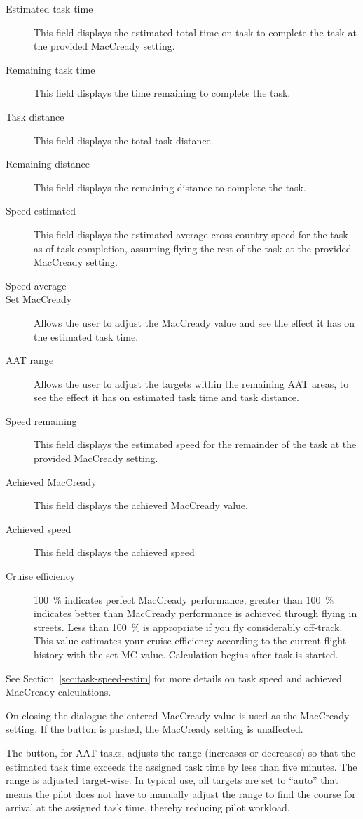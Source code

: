 \begin{description}
\item[Estimated task time]  This field displays the estimated total time 
  on task to complete the task at the provided MacCready setting.
\item[Remaining task time]  This field displays the time remaining to complete the task.
\item[Task distance]  This field displays the total task distance.
\item[Remaining distance]  This field displays the remaining distance to complete the task.
\item[Speed estimated]  This field displays the estimated average cross-country 
speed for the task as of task completion, assuming flying the rest of the task 
at the provided MacCready setting.
\item[Speed average]  %
\item[Set MacCready]  Allows the user to adjust the MacCready value and 
  see the effect it has on the estimated task time.
\item[AAT range]  Allows the user to adjust the targets within the remaining 
  AAT areas, to see the effect it has on estimated task time and task distance.
\item[Speed remaining]  This field displays the estimated speed for the
  remainder of the task at the provided MacCready setting.
\item[Achieved MacCready]  This field displays the achieved MacCready value.
\item[Achieved speed]  This field displays the achieved speed %
\item[Cruise efficiency]  100~\% indicates perfect MacCready performance, greater 
than 100~\% indicates better than MacCready performance is achieved through flying
in streets. Less than 100~\% is appropriate if you fly considerably off-track. This 
value estimates your cruise efficiency according to the current flight history 
with the set MC value. Calculation begins after task is started.
\end{description}
See Section~\ref{sec:task-speed-estim} for more details on task speed
and achieved MacCready calculations.

On closing the dialogue the entered MacCready value is used as the MacCready 
setting. If the  button is pushed, the MacCready setting is 
unaffected.

The  button, for AAT tasks, adjusts the range
(increases or decreases) so that the estimated task time exceeds the
assigned task time by less than five minutes.  The range is adjusted
target-wise. In typical use, all targets are set to ``auto'' that means the pilot
does not have to manually adjust the range to find the course for arrival at 
the assigned task time, thereby reducing pilot workload.

